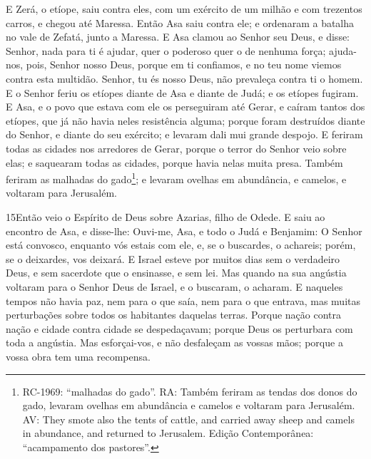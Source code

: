 E Zerá, o etíope, saiu contra eles, com um exército de um milhão e
com trezentos carros, e chegou até Maressa. Então Asa saiu
contra ele; e ordenaram a batalha no vale de Zefatá, junto a
Maressa. E Asa clamou ao Senhor seu Deus, e disse: Senhor,
nada para ti é ajudar, quer o poderoso quer o de nenhuma força;
ajuda-nos, pois, Senhor nosso Deus, porque em ti confiamos, e no teu
nome viemos contra esta multidão. Senhor, tu és nosso Deus, não
prevaleça contra ti o homem. E o Senhor feriu os etíopes
diante de Asa e diante de Judá; e os etíopes fugiram. E Asa,
e o povo que estava com ele os perseguiram até Gerar, e caíram
tantos dos etíopes, que já não havia neles resistência alguma;
porque foram destruídos diante do Senhor, e diante do seu exército;
e levaram dali mui grande despojo. E feriram todas as cidades
nos arredores de Gerar, porque o terror do Senhor veio sobre elas; e
saquearam todas as cidades, porque havia nelas muita presa.
Também feriram as malhadas do gado\footnote{RC-1969:
``malhadas do gado''. RA: Também feriram as tendas dos donos do
gado, levaram ovelhas em abundância e camelos e voltaram para
Jerusalém. AV: They smote also the tents of cattle, and carried away
sheep and camels in abundance, and returned to Jerusalem. Edição
Contemporânea: ``acampamento dos pastores''.}; e levaram ovelhas em
abundância, e camelos, e voltaram para Jerusalém.

\medskip

\lettrine{15} Então veio o Espírito de Deus sobre Azarias,
filho de Odede. E saiu ao encontro de Asa, e disse-lhe: Ouvi-me,
Asa, e todo o Judá e Benjamim: O Senhor está convosco, enquanto vós
estais com ele, e, se o buscardes, o achareis; porém, se o
deixardes, vos deixará. E Israel esteve por muitos dias sem o
verdadeiro Deus, e sem sacerdote que o ensinasse, e sem lei. Mas
quando na sua angústia voltaram para o Senhor Deus de Israel, e o
buscaram, o acharam. E naqueles tempos não havia paz, nem para o
que saía, nem para o que entrava, mas muitas perturbações sobre
todos os habitantes daquelas terras. Porque nação contra nação e
cidade contra cidade se despedaçavam; porque Deus os perturbara com
toda a angústia. Mas esforçai-vos, e não desfaleçam as vossas
mãos; porque a vossa obra tem uma recompensa.

